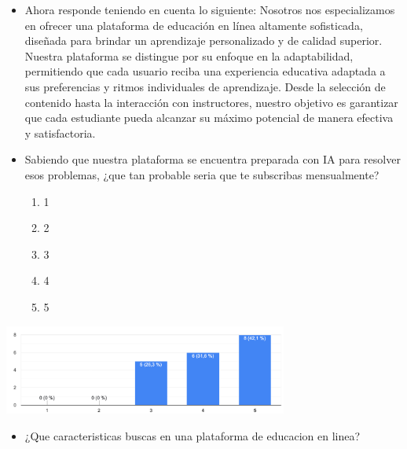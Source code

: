 \documentclass[
]{article}
\providecommand{\tightlist}{%
  \setlength{\itemsep}{0pt}\setlength{\parskip}{0pt}}
\begin{document}
\begin{itemize}
\item
  Ahora responde teniendo en cuenta lo siguiente: Nosotros nos
  especializamos en ofrecer una plataforma de educación en línea
  altamente sofisticada, diseñada para brindar un aprendizaje
  personalizado y de calidad superior. Nuestra plataforma se distingue
  por su enfoque en la adaptabilidad, permitiendo que cada usuario
  reciba una experiencia educativa adaptada a sus preferencias y ritmos
  individuales de aprendizaje. Desde la selección de contenido hasta la
  interacción con instructores, nuestro objetivo es garantizar que cada
  estudiante pueda alcanzar su máximo potencial de manera efectiva y
  satisfactoria.
\item
  Sabiendo que nuestra plataforma se encuentra preparada con IA para
  resolver esos problemas, ¿que tan probable seria que te subscribas
  mensualmente?

  \begin{enumerate}
  \def\labelenumi{\alph{enumi}.}
  \tightlist
  \item
    1
  \item
    2
  \item
    3
  \item
    4
  \item
    5
  \end{enumerate}
\end{itemize}

\includegraphics[width=0.7\textwidth,height=\textheight]{img/ratting.png}

\newpage

\vspace{10mm}

\begin{itemize}
\tightlist
\item
  ¿Que caracteristicas buscas en una plataforma de educacion en linea?
\end{itemize}
\end{document}
